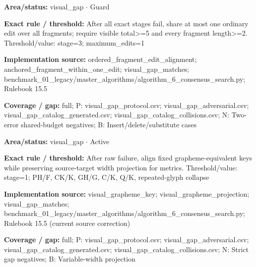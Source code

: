 \begin{tcolorbox}[enhanced,breakable,colback=white,colframe=Muted!45,boxrule=0.45pt,arc=1.5pt,left=6pt,right=6pt,top=5pt,bottom=5pt,title={\texttt{VG-FUZZY-STAGE-10}},title after break={\texttt{VG-FUZZY-STAGE-10}\ (continued)},fonttitle=\headingfont\bfseries\color{Navy},coltitle=Navy]
\textbf{Area/status:} visual\_\allowbreak{}gap $\boldsymbol{\cdot}$ Guard\par
\smallskip
\textbf{Exact rule / threshold:} After all exact stages fail, share at most one ordinary edit over all fragments; require visible total>=5 and every fragment length>=2. Threshold/\allowbreak{}value: stage=3; maximum\_\allowbreak{}edits=1\par
\smallskip
\textbf{Implementation source:} ordered\_\allowbreak{}fragment\_\allowbreak{}edit\_\allowbreak{}alignment; anchored\_\allowbreak{}fragment\_\allowbreak{}within\_\allowbreak{}one\_\allowbreak{}edit; visual\_\allowbreak{}gap\_\allowbreak{}matches; benchmark\_\allowbreak{}01\_\allowbreak{}legacy/\allowbreak{}master\_\allowbreak{}algorithms/\allowbreak{}algorithm\_\allowbreak{}6\_\allowbreak{}consensus\_\allowbreak{}search.py; Rulebook 15.5\par
\smallskip
\textbf{Coverage / gap:} full; P: visual\_\allowbreak{}gap\_\allowbreak{}protocol.csv; visual\_\allowbreak{}gap\_\allowbreak{}adversarial.csv; visual\_\allowbreak{}gap\_\allowbreak{}catalog\_\allowbreak{}generated.csv; visual\_\allowbreak{}gap\_\allowbreak{}catalog\_\allowbreak{}collisions.csv; N: Two-error shared-budget negatives; B: Insert/\allowbreak{}delete/\allowbreak{}substitute cases
\end{tcolorbox}
\begin{tcolorbox}[enhanced,breakable,colback=white,colframe=Muted!45,boxrule=0.45pt,arc=1.5pt,left=6pt,right=6pt,top=5pt,bottom=5pt,title={\texttt{VG-GRAPHEME-STAGE-08}},title after break={\texttt{VG-GRAPHEME-STAGE-08}\ (continued)},fonttitle=\headingfont\bfseries\color{Navy},coltitle=Navy]
\textbf{Area/status:} visual\_\allowbreak{}gap $\boldsymbol{\cdot}$ Active\par
\smallskip
\textbf{Exact rule / threshold:} After raw failure, align fixed grapheme-equivalent keys while preserving source-target width projection for metrics. Threshold/\allowbreak{}value: stage=1; PH/\allowbreak{}F, CK/\allowbreak{}K, GH/\allowbreak{}G, C/\allowbreak{}K, Q/\allowbreak{}K, repeated-glyph collapse\par
\smallskip
\textbf{Implementation source:} visual\_\allowbreak{}grapheme\_\allowbreak{}key; visual\_\allowbreak{}grapheme\_\allowbreak{}projection; visual\_\allowbreak{}gap\_\allowbreak{}matches; benchmark\_\allowbreak{}01\_\allowbreak{}legacy/\allowbreak{}master\_\allowbreak{}algorithms/\allowbreak{}algorithm\_\allowbreak{}6\_\allowbreak{}consensus\_\allowbreak{}search.py; Rulebook 15.5 (current source correction)\par
\smallskip
\textbf{Coverage / gap:} full; P: visual\_\allowbreak{}gap\_\allowbreak{}protocol.csv; visual\_\allowbreak{}gap\_\allowbreak{}adversarial.csv; visual\_\allowbreak{}gap\_\allowbreak{}catalog\_\allowbreak{}generated.csv; visual\_\allowbreak{}gap\_\allowbreak{}catalog\_\allowbreak{}collisions.csv; N: Strict gap negatives; B: Variable-width projection
\end{tcolorbox}
